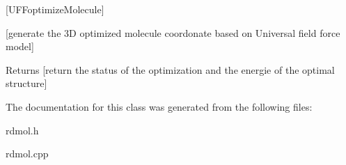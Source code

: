 \mbox{[}U\+F\+Foptimize\+Molecule\mbox{]} 

\mbox{[}generate the 3D optimized molecule coordonate based on Universal field force model\mbox{]}

\begin{DoxyReturn}{Returns}
\mbox{[}return the status of the optimization and the energie of the optimal structure\mbox{]} 
\end{DoxyReturn}


The documentation for this class was generated from the following files\+:\begin{DoxyCompactItemize}
\item 
rdmol.\+h\item 
rdmol.\+cpp\end{DoxyCompactItemize}
